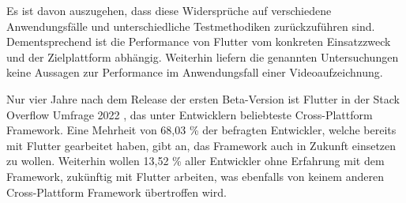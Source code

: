 Es ist davon auszugehen, dass diese Widersprüche auf verschiedene Anwendungsfälle und unterschiedliche Testmethodiken zurückzuführen sind.
Dementsprechend ist die Performance von Flutter vom konkreten Einsatzzweck und der Zielplattform abhängig.
Weiterhin liefern die genannten Untersuchungen keine Aussagen zur Performance im Anwendungsfall einer Videoaufzeichnung.

Nur vier Jahre nach dem Release der ersten Beta-Version \cite{Sharma_Flutter} ist Flutter in der Stack Overflow Umfrage 2022 \cite{Stackoverflow_2022}, das unter Entwicklern beliebteste Cross-Plattform Framework.
Eine Mehrheit von 68,03 \% der befragten Entwickler, welche bereits mit Flutter gearbeitet haben, gibt an, das Framework auch in Zukunft einsetzen zu wollen.
Weiterhin wollen 13,52 \% aller Entwickler ohne Erfahrung mit dem Framework, zukünftig mit Flutter arbeiten, was ebenfalls von keinem anderen Cross-Plattform Framework übertroffen wird.

